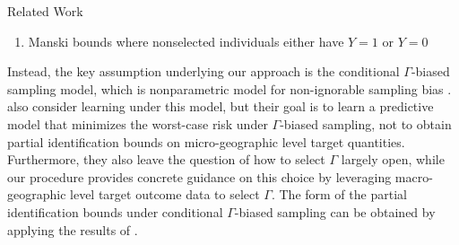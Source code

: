 \begin{subsection}{Related Work}
\begin{enumerate}
    \item \citet{manski2016credible} Manski bounds where nonselected individuals either have $Y=1$ or $Y=0$
\end{enumerate}

	Instead, the key assumption underlying our approach is the conditional $\Gamma$-biased sampling model, which is nonparametric model for non-ignorable sampling bias \citep{sahoo2022learning}. \citet{sahoo2022learning} also consider learning under this model, but their goal is to learn a predictive model that minimizes the worst-case risk under $\Gamma$-biased sampling, not to obtain partial identification bounds on micro-geographic level target quantities. Furthermore, they also leave the question of how to select $\Gamma$ largely open, while our procedure provides concrete guidance on this choice by leveraging macro-geographic level target outcome data to select $\Gamma$. The form of the partial identification bounds under conditional $\Gamma$-biased sampling can be obtained by applying the results of \citet{dorn2024doubly,rockafellar2000optimization}.
\end{subsection}






